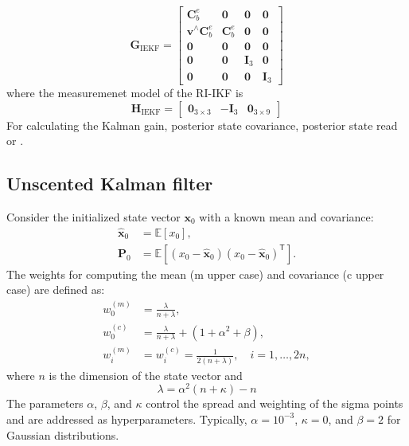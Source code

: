\documentclass[conference]{IEEEtran}
\begin{document}
\begin{equation}
\mathbf G_{\text{IEKF}}
=
\begin{bmatrix}
\mathbf C_b^e
& \mathbf 0
& \mathbf 0
& \mathbf 0
\\
\boldsymbol v^\wedge\mathbf C_b^e
& \mathbf C_b^e
& \mathbf 0
& \mathbf 0
\\
\mathbf 0
& \mathbf 0
& \mathbf 0
& \mathbf 0
\\
\mathbf 0
& \mathbf 0
& \mathbf I_3
& \mathbf 0
\\
\mathbf 0
& \mathbf 0
& \mathbf 0
& \mathbf I_3
\end{bmatrix}
\end{equation}
where the measuremenet model of the RI-IKF is
\begin{equation}
\mathbf H_{\text{IEKF}}
=
\begin{bmatrix}
\mathbf 0_{3\times3} & -\mathbf I_3 & \mathbf 0_{3\times9}
\end{bmatrix}
\end{equation}
For calculating the Kalman gain, posterior state covariance, posterior state read \cite{luo2021se2} or \cite{diker2026neural}.  
\subsection{Unscented Kalman filter}
\label{ukf}
Consider the initialized state vector $\mathbf{x}_0$ with a known mean and covariance:
%
\begin{align}
\hat{\mathbf{x}}_0 &= \mathbb{E}[{x}_0], \\
\mathbf{P}_0 &= \mathbb{E}\!\left[({x}_0 - \hat{\mathbf{x}}_0)
({x}_0 - \hat{\mathbf{x}}_0)^\mathsf{T}\right].
\end{align}
%
\noindent The weights for computing the mean (m upper case) and covariance (c upper case) are defined as:
\begin{align}
w_0^{(m)} &= \frac{\lambda}{n + \lambda}, \\
w_0^{(c)} &= \frac{\lambda}{n + \lambda} + (1 + \alpha^2 + \beta), \\
w_i^{(m)} &= w_i^{(c)} = \frac{1}{2(n + \lambda)}, \quad i = 1, \ldots, 2n,
\end{align}
where $n$ is the dimension of the state vector and
\begin{equation}
\lambda = \alpha^2 (n + \kappa) - n
\end{equation}
The parameters $\alpha$, $\beta$, and $\kappa$ control the spread and weighting of the sigma points and are addressed as hyperparameters. Typically, $\alpha = 10^{-3}$, $\kappa = 0$, and $\beta = 2$ for
Gaussian distributions.
%
\end{document}

